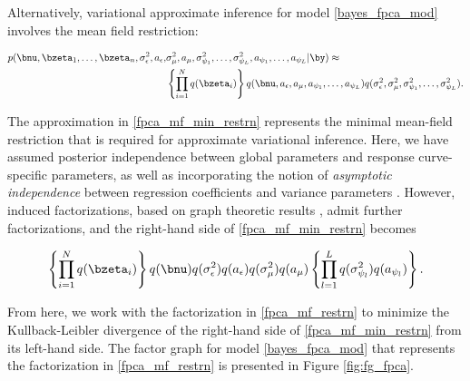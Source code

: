 \documentclass[12pt]{article}
\def\sigsqeps{\sigma^2_{\epsilon}}
\def\aeps{a_{\epsilon}}
\def\sigsqmu{\sigma^2_{\mu}}
\def\amu{a_{\mu}}
\newcommand\sigsqpsi[1]{\sigma^2_{\psi_{#1}}}
\newcommand\apsi[1]{a_{\psi_{#1}}}
\theoremstyle{plain}
\theoremstyle{definition}
\theoremstyle{remark}
\begin{document}
Alternatively, variational approximate inference for model \eqref{bayes_fpca_mod} involves
the mean field restriction:

\begin{align}
\begin{split}
	p (
		\bnu, \bzeta_1, \dots, \bzeta_n, \sigsqeps, \aeps, &\sigsqmu, \amu,
		\sigsqpsi{1}, \dots, \sigsqpsi{L}, \apsi{1}, \dots, \apsi{L} | \by
	) \approx \\
		&\left\{ \prod_{i=1}^N q (\bzeta_i) \right\} q (\bnu, \aeps, \amu, \apsi{1}, \dots, \apsi{L})
		q(\sigsqeps, \sigsqmu, \sigsqpsi{1}, \dots, \sigsqpsi{L}).
\end{split}
\label{fpca_mf_min_restrn}
\end{align}

\noindent The approximation in \eqref{fpca_mf_min_restrn} represents the minimal mean-field restriction that is
required for approximate variational inference. Here, we have assumed posterior independence between
global parameters and response curve-specific parameters, as well as incorporating the notion of
\emph{asymptotic independence} between regression coefficients and variance parameters
\cite[Section~3.1]{menictas13}.
However, induced factorizations, based on graph theoretic
results \cite[Section~10.2.5]{bishop06}, admit further factorizations, and the right-hand side of
\eqref{fpca_mf_min_restrn} becomes

\begin{equation}
	\left\{ \prod_{i=1}^N q (\bzeta_i) \right\} q (\bnu) q(\sigsqeps) q(\aeps)
	q(\sigsqmu) q (\amu) \left\{ \prod_{l=1}^L q(\sigsqpsi{l}) q(\apsi{l}) \right\}.
\label{fpca_mf_restrn}
\end{equation}

\noindent From here, we work with the factorization in \eqref{fpca_mf_restrn} to minimize the Kullback-Leibler
divergence  of the right-hand side of \eqref{fpca_mf_min_restrn} from its left-hand side.
The factor graph for model \eqref{bayes_fpca_mod} that represents the factorization in \eqref{fpca_mf_restrn}
is presented in Figure \ref{fig:fg_fpca}.
\end{document}
